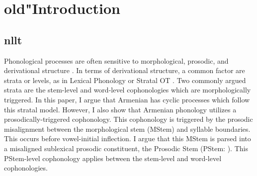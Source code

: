 







\section{old"Introduction}\label{nlttPapersection: reduction: intro}
\subsection{nllt}




Phonological processes are often sensitive to morphological, prosodic, and derivational structure \citep{Nespor-Vogel-1986-ProsodicPhon,HargusKaisse-1993-StudiesLexicalPhono,Scheer-2011-GuideMorphoPhonologyInterface}. In terms of derivational structure, a common factor are strata or levels, as in Lexical Phonology \citep{Kiparsky-1982-lexicalMorphoPhono} or Stratal OT \citep{BermudezOtero-2018-StratalPhonology}. Two commonly argued strata are the stem-level and word-level cophonologies which are morphologically triggered. In this paper, I argue that Armenian has cyclic processes which follow this stratal model. However, I also show that Armenian phonology utilizes a prosodically-triggered cophonology. This cophonology is triggered by the prosodic misalignment between the morphological stem (MStem) and syllable boundaries. This occurs before vowel-initial inflection. I argue that this MStem is parsed into a misaligned sublexical prosodic constituent, the Prosodic Stem (PStem: \citealt{Downing-1999-ProsodicStem}). This PStem-level cophonology applies between the stem-level and word-level cophonologies.%


